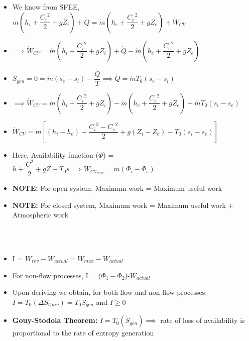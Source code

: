 \documentclass[8pt]{article}
\begin{document}
	\begin{itemize}
		\item We know from SFEE, $\boxed{\dot{m}  \left(h_i + \dfrac{{C_i}^2}{2} + gZ_i \right) + \dot{Q} = \dot{m}\left(h_e + \dfrac{{C_e}^2}{2} + gZ_e\right) + \dot{W}_{CV}}$
		\item $\implies \dot{W}_{CV} = \dot{m}  \left(h_i + \dfrac{{C_i}^2}{2} + gZ_i \right) + \dot{Q} - \dot{m}\left(h_e + \dfrac{{C_e}^2}{2} + gZ_e\right) $
		\item $S_{gen} = 0 = \dot{m}(s_e-s_i)-\dfrac{\dot{Q}}{T} \implies \dot{Q} = \dot{m}T_0(s_e-s_i)$
		\item $\implies \dot{W}_{CV} = \dot{m}  \left(h_i + \dfrac{{C_i}^2}{2} + gZ_i \right) - \dot{m}\left(h_e + \dfrac{{C_e}^2}{2} + gZ_e\right) - \dot{m}T_0(s_i-s_e)$
		\item $\dot{W}_{CV} = \dot{m}\left[(h_i-h_e)+\dfrac{{C_i}^2-{C_e}^2}{2}+g(Z_i-Z_e)-T_0(s_i-s_e)\right]$
		\item Here, Availability function ($\Phi$) = $h+\dfrac{C^2}{2}+gZ-T_0s \implies \dot{W}_{{CV}_{max}}=\dot{m}(\Phi_i-\Phi_e)$
		\item \textbf{NOTE: }For open system, Maximum work = Maximum useful work
		\item \textbf{NOTE: }For closed system, Maximum work = Maximum useful work + Atmospheric work
	\end{itemize}\hrulefill\\\\
	\begin{itemize}
		\item I = $W_{rev}-W_{actual} = W_{max}-W_{actual}$
		\item For non-flow processes, I = ($\Phi_1-\Phi_2$)-$W_{actual}$
		\item Upon deriving we obtain, for both flow and non-flow processes: $\boxed{I=T_0(\Delta S_{Univ}) = T_0S_{gen}}$ and $I\ge0$
		\item \textbf{Gouy-Stodola Theorem: } $\dot{I}=T_0\left(\dot{S}_{gen}\right) \implies$ rate of loss of availability is proportional to the rate of entropy generation
	\end{itemize}\hrulefill\\\\
\end{document}
